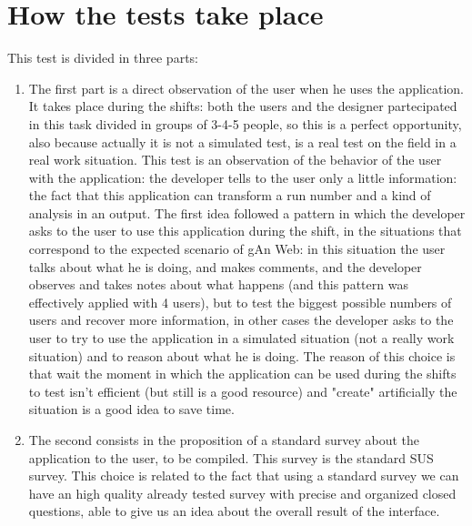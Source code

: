 \section{How the tests take place} 

This test is divided in three parts: 
\begin{enumerate}
\item
The first part is a direct observation of the user when he uses the application. It takes place during the shifts: both the users and the designer partecipated in this task divided in groups of 3-4-5 people, so this is a perfect opportunity, also because actually it is not a simulated test, is a real test on the field in a real work situation. This test is an observation of the behavior of the user with the application: the developer tells to the user only a little information: the fact that this application can transform a run number and a kind of analysis in an output. 
The first idea followed a pattern in which the developer asks to the user to use this application during the shift, in the situations that correspond to the expected scenario of gAn Web: in this situation the user talks about what he is doing, and makes comments, and the developer observes and takes notes about what happens (and this pattern was effectively applied with 4 users), but to test the biggest possible numbers of users and recover more information, in other cases the developer asks to the user to try to use the application in a simulated situation (not a really work situation) and to reason about what he is doing. The reason of this choice is that wait the moment in which the application can be used during the shifts to test isn't efficient (but still is a good resource) and "create" artificially the situation is a good idea to save time.

\item
The second consists in the proposition of a standard survey about the application to the user, to be compiled. This survey is the standard SUS survey. This choice is related to the fact that using a standard survey we can have an high quality already tested survey with precise and organized closed questions, able to give us an idea about the overall result of the interface. 


\end{enumerate}
